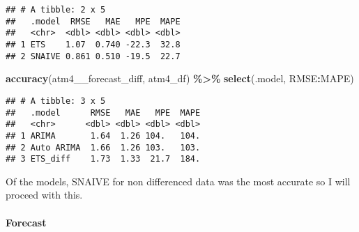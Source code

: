 \documentclass[
]{article}
\newenvironment{Shaded}{\begin{snugshade}}{\end{snugshade}}
\newcommand{\AttributeTok}[1]{\textcolor[rgb]{0.13,0.29,0.53}{#1}}
\newcommand{\CommentTok}[1]{\textcolor[rgb]{0.56,0.35,0.01}{\textit{#1}}}
\newcommand{\DecValTok}[1]{\textcolor[rgb]{0.00,0.00,0.81}{#1}}
\newcommand{\FunctionTok}[1]{\textcolor[rgb]{0.13,0.29,0.53}{\textbf{#1}}}
\newcommand{\NormalTok}[1]{#1}
\newcommand{\OtherTok}[1]{\textcolor[rgb]{0.56,0.35,0.01}{#1}}
\newcommand{\SpecialCharTok}[1]{\textcolor[rgb]{0.81,0.36,0.00}{\textbf{#1}}}
\newcommand{\StringTok}[1]{\textcolor[rgb]{0.31,0.60,0.02}{#1}}
\begin{document}
\begin{verbatim}
## # A tibble: 2 x 5
##   .model  RMSE   MAE   MPE  MAPE
##   <chr>  <dbl> <dbl> <dbl> <dbl>
## 1 ETS    1.07  0.740 -22.3  32.8
## 2 SNAIVE 0.861 0.510 -19.5  22.7
\end{verbatim}

\begin{Shaded}
\begin{Highlighting}[]
\FunctionTok{accuracy}\NormalTok{(atm4\_\_forecast\_diff, atm4\_df) }\SpecialCharTok{\%\textgreater{}\%}
  \FunctionTok{select}\NormalTok{(.model, RMSE}\SpecialCharTok{:}\NormalTok{MAPE)}
\end{Highlighting}
\end{Shaded}

\begin{verbatim}
## # A tibble: 3 x 5
##   .model      RMSE   MAE   MPE  MAPE
##   <chr>      <dbl> <dbl> <dbl> <dbl>
## 1 ARIMA       1.64  1.26 104.   104.
## 2 Auto ARIMA  1.66  1.26 103.   103.
## 3 ETS_diff    1.73  1.33  21.7  184.
\end{verbatim}

Of the models, SNAIVE for non differenced data was the most accurate so
I will proceed with this.

\hypertarget{forecast-2}{%
\paragraph{Forecast}\label{forecast-2}}

\begin{Shaded}
\end{Shaded}
\end{document}
